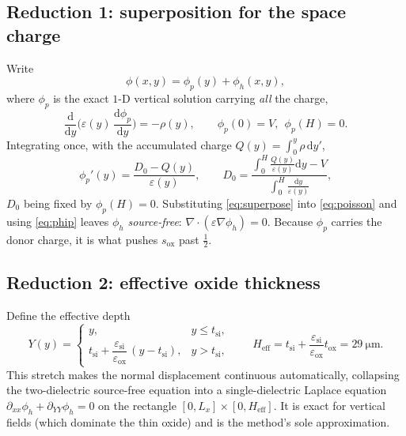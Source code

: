 \documentclass[11pt]{article}
\newcommand{\eox}{\varepsilon_{\mathrm{ox}}}
\newcommand{\esi}{\varepsilon_{\mathrm{si}}}
\newcommand{\tox}{t_{\mathrm{ox}}}
\newcommand{\tsi}{t_{\mathrm{si}}}
\newcommand{\Heff}{H_{\mathrm{eff}}}
\newcommand{\Lx}{L_{x}}
\newcommand{\phih}{\phi_{h}}
\newcommand{\phip}{\phi_{p}}
\newcommand{\dd}{\mathrm{d}}
\begin{document}
\subsection{Reduction 1: superposition for the space charge}
Write
\begin{equation}
\phi(x,y)=\phip(y)+\phih(x,y),
\label{eq:superpose}
\end{equation}
where $\phip$ is the exact $1$-D vertical solution carrying \emph{all} the charge,
\begin{equation}
\frac{\dd}{\dd y}\!\Big(\varepsilon(y)\,\frac{\dd\phip}{\dd y}\Big)=-\rho(y),
\qquad \phip(0)=V,\ \ \phip(H)=0.
\label{eq:phip}
\end{equation}
Integrating once, with the accumulated charge $Q(y)=\int_{0}^{y}\rho\,\dd y'$,
\begin{equation}
\phip'(y)=\frac{D_{0}-Q(y)}{\varepsilon(y)},
\qquad
D_{0}=\frac{\displaystyle\int_{0}^{H}\!\frac{Q(y)}{\varepsilon(y)}\dd y - V}
           {\displaystyle\int_{0}^{H}\!\frac{\dd y}{\varepsilon(y)}},
\label{eq:phipclosed}
\end{equation}
$D_{0}$ being fixed by $\phip(H)=0$. Substituting \eqref{eq:superpose} into
\eqref{eq:poisson} and using \eqref{eq:phip} leaves $\phih$ \emph{source-free}:
$\nabla\!\cdot(\varepsilon\nabla\phih)=0$. Because $\phip$ carries the donor charge,
it is what pushes $s_{\mathrm{ox}}$ past $\tfrac12$.

\subsection{Reduction 2: effective oxide thickness}
Define the effective depth
\begin{equation}
Y(y)=\begin{cases} y, & y\le\tsi,\\[2pt]
 \tsi+\dfrac{\esi}{\eox}\,(y-\tsi), & y>\tsi,\end{cases}
\qquad \Heff=\tsi+\frac{\esi}{\eox}\tox=\SI{29}{\micro\meter}.
\label{eq:Yeff}
\end{equation}
This stretch makes the normal displacement continuous automatically, collapsing the
two-dielectric source-free equation into a single-dielectric Laplace equation
$\partial_{xx}\phih+\partial_{YY}\phih=0$ on the rectangle $[0,\Lx]\times[0,\Heff]$.
It is exact for vertical fields (which dominate the thin oxide) and is the method's
sole approximation.
\end{document}

